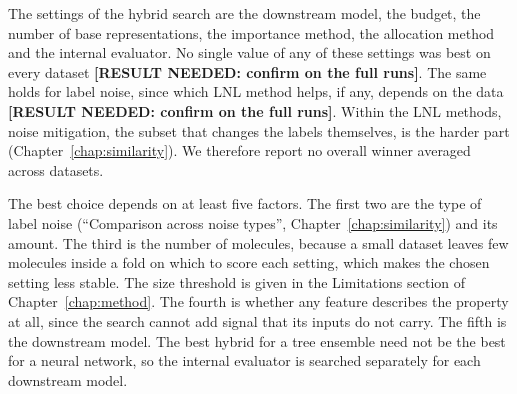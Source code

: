 
The settings of the hybrid search are the downstream model, the budget, the number of base representations, the importance method, the allocation method and the internal evaluator. No single value of any of these settings was best on every dataset \textbf{[RESULT NEEDED: confirm on the full runs]}. The same holds for label noise, since which LNL method helps, if any, depends on the data \textbf{[RESULT NEEDED: confirm on the full runs]}. Within the LNL methods, noise mitigation, the subset that changes the labels themselves, is the harder part (Chapter~\ref{chap:similarity}). We therefore report no overall winner averaged across datasets.

The best choice depends on at least five factors. The first two are the type of label noise (``Comparison across noise types'', Chapter~\ref{chap:similarity}) and its amount. The third is the number of molecules, because a small dataset leaves few molecules inside a fold on which to score each setting, which makes the chosen setting less stable. The size threshold is given in the Limitations section of Chapter~\ref{chap:method}. The fourth is whether any feature describes the property at all, since the search cannot add signal that its inputs do not carry. The fifth is the downstream model. The best hybrid for a tree ensemble need not be the best for a neural network, so the internal evaluator is searched separately for each downstream model.

